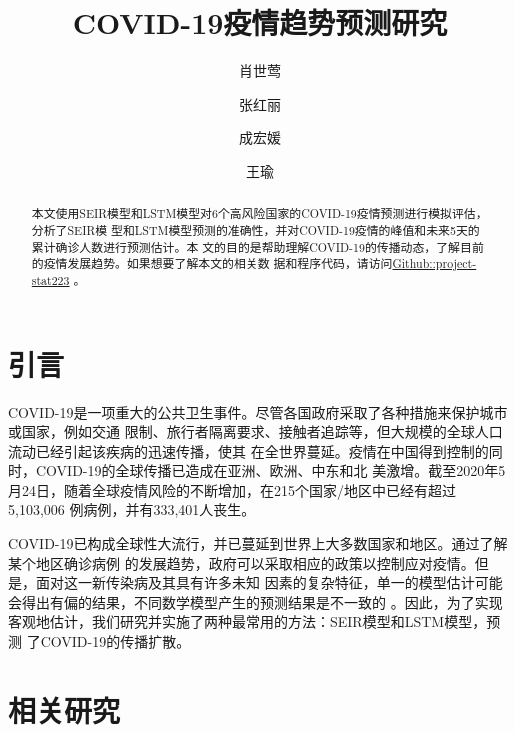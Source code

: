 \documentclass[lang=cn,12pt,a4paper,cite=authoryear]{elegantpaper}
\title{COVID-19疫情趋势预测研究}
\author{肖世莺 \and 张红丽 \and 成宏媛 \and 王瑜}
\date{}
\begin{document}
\maketitle

\begin{abstract}

本文使用SEIR模型和LSTM模型对6个高风险国家的COVID-19疫情预测进行模拟评估，分析了SEIR模
型和LSTM模型预测的准确性，并对COVID-19疫情的峰值和未来5天的累计确诊人数进行预测估计。本
文的目的是帮助理解COVID-19的传播动态，了解目前的疫情发展趋势。如果想要了解本文的相关数
据和程序代码，请访问\href{https://github.com/data-science-in-action/project-stat223}{Github::project-stat223}
。
\end{abstract}

\section{引言}

COVID-19是一项重大的公共卫生事件。尽管各国政府采取了各种措施来保护城市或国家，例如交通
限制、旅行者隔离要求、接触者追踪等，但大规模的全球人口流动已经引起该疾病的迅速传播，使其
在全世界蔓延。疫情在中国得到控制的同时，COVID-19的全球传播已造成在亚洲、欧洲、中东和北
美激增。截至2020年5月24日，随着全球疫情风险的不断增加，在215个国家/地区中已经有超过5,103,006
例病例，并有333,401人丧生。

COVID-19已构成全球性大流行，并已蔓延到世界上大多数国家和地区。通过了解某个地区确诊病例
的发展趋势，政府可以采取相应的政策以控制应对疫情。但是，面对这一新传染病及其具有许多未知
因素的复杂特征，单一的模型估计可能会得出有偏的结果，不同数学模型产生的预测结果是不一致的
。因此，为了实现客观地估计，我们研究并实施了两种最常用的方法：SEIR模型和LSTM模型，预测
了COVID-19的传播扩散。

\section{相关研究}
\end{document}
